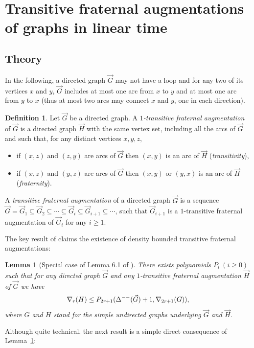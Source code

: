 \documentclass[a4paper]{amsart}
\newtheorem{lemma}[theorem]{Lemma}
\theoremstyle{definition}
\newtheorem{definition}{Definition}[section]
\theoremstyle{remark}
\newcommand{\rdens}[1]{\nabla_{#1}}
\DeclareMathOperator\md{\Delta^{\rm --}}
\def\vG{\vec{G}}
\def\vH{\vec{H}}
\begin{document}
\section{Transitive fraternal augmentations of graphs in linear time}
\label{sec:aug}
\subsection{Theory}
In the following, a directed graph $\vG$ may not have a loop and for
any two of its vertices $x$ and $y$, $\vG$ includes at most one arc
from $x$ to $y$ and at most one arc from $y$ to $x$ 
(thus at most two arcs may connect $x$ and $y$, one in each direction).

\begin{definition}
Let $\vG$ be a directed graph. A {\em $1$-transitive fraternal augmentation} of $\vG$
is a directed graph $\vH$ with the same vertex set, including all the
arcs of $\vG$ and such that, for any distinct vertices $x,y,z$,
\begin{itemize}
\item if $(x,z)$ and $(z,y)$ are arcs of $\vG$ then $(x,y)$ is an arc
  of $\vH$ ({\em transitivity}),
\item  if $(x,z)$ and $(y,z)$ are arcs of $\vG$ then $(x,y)$ or $(y,x)$ is an arc
  of $\vH$ ({\em fraternity}).
\end{itemize}

A {\em transitive fraternal augmentation} of a directed graph $\vG$ is a sequence
$\vG=\vG_1\subseteq\vG_2\subseteq\dotsb\subseteq \vG_i\subseteq\vG_{i+1}\subseteq\dotsb$,
such that $\vG_{i+1}$ is a $1$-transitive fraternal augmentation of $\vG_i$ for any
$i\geq 1$.
\end{definition}

The key result of \cite{POMNI} claims the existence of density bounded
transitive fraternal augmentations:
\begin{lemma}[Special case of Lemma 6.1 of \cite{POMNI}]
\label{lem:faug}
There exists polynomials $P_i\ (i\geq 0)$ such that for any directed graph
 $\vG$ and any $1$-transitive fraternal augmentation $\vH$ 
of $\vG$ we have
\begin{equation}
\rdens{r}(H) \leq P_{2r+1}(\md(\vG)+1,\rdens{2r+1}(G)),
\end{equation}
where $G$ and $H$ stand for the simple undirected graphs underlying $\vG$
and $\vH$.
\end{lemma}

Although quite technical, the next result is a simple direct
consequence of Lemma~\ref{lem:faug}:
\end{document}
